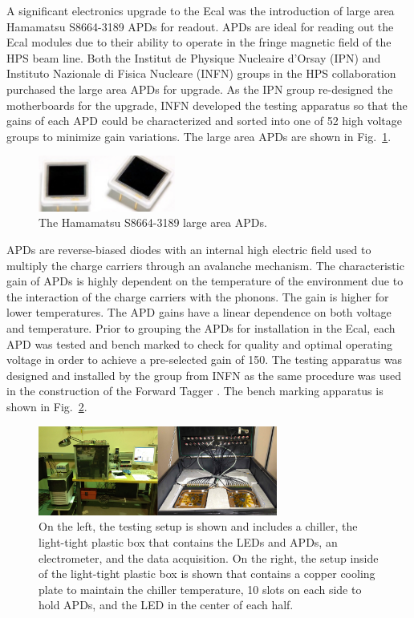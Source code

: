 A significant electronics upgrade to the Ecal was the introduction of large area Hamamatsu S8664-3189 APDs for readout. APDs are ideal for reading out the Ecal modules due to their ability to operate in the fringe magnetic field of the HPS beam line. Both the Institut de Physique Nucleaire d'Orsay (IPN) and Instituto Nazionale di Fisica Nucleare (INFN) groups in the HPS collaboration purchased the large area APDs for upgrade. As the IPN group re-designed the motherboards for the upgrade, INFN developed the testing apparatus so that the gains of each APD could be characterized and sorted into one of 52 high voltage groups to minimize gain variations. The large area APDs are shown in Fig.~\ref{Figure:apd}.

\begin{figure}[H]
  \centering
      \includegraphics[width=0.4\textwidth]{pics/experiment/apd.png}
  \caption[Hamamatsu S8664-3189 large area APDs]{The Hamamatsu S8664-3189 large area APDs.}
  \label{Figure:apd}
\end{figure}

APDs are reverse-biased diodes with an internal high electric field used to multiply the charge carriers through an avalanche mechanism.  The characteristic gain of APDs is highly dependent on the temperature of the environment due to the interaction of the charge carriers with the phonons. The gain is higher for lower temperatures. 
The APD gains have a linear dependence on both voltage and temperature. Prior to grouping the APDs for installation in the Ecal, each APD was tested and bench marked to check for quality and optimal operating voltage in order to achieve a pre-selected gain of 150. The testing apparatus was designed and installed by the group from INFN as the same procedure was used in the construction of the Forward Tagger \cite{Celentano}. The bench marking apparatus is shown in Fig.~\ref{Figure:apdtest}.

\begin{figure}[H]
  \centering
      \includegraphics[width=0.7\textwidth]{pics/experiment/apdtests.png}
  \caption[Testing assembly for large area APDs]{On the left, the testing setup is shown and includes a chiller, the light-tight plastic box that contains the LEDs and APDs, an electrometer, and the data acquisition. On the right, the setup inside of the light-tight plastic box is shown that contains a copper cooling plate to maintain the chiller temperature, 10 slots on each side to hold APDs, and the LED in the center of each half.}
  \label{Figure:apdtest}
\end{figure}

